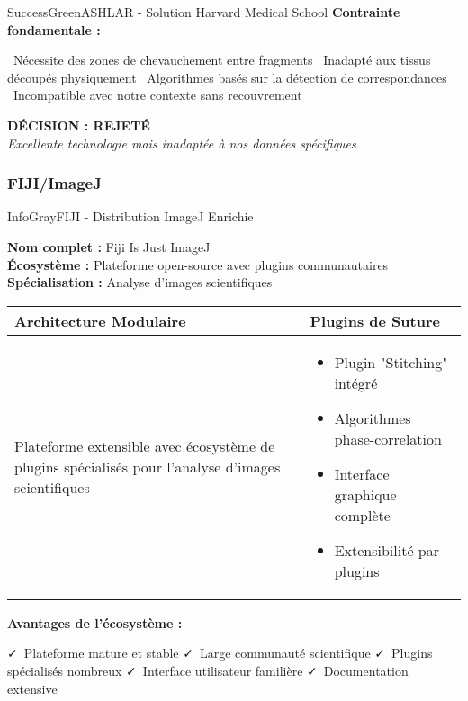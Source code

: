 \documentclass[12pt,a4paper]{report}
\newcommand{\pro}[1]{\textcolor{SuccessGreen}{\faCheck\ #1}}
\newcommand{\con}[1]{\textcolor{DangerRed}{\faTimes\ #1}}
\begin{document}
\begin{}
\begin{}
\begin{}
\begin{}
\begin{techbox}{SuccessGreen}{ASHLAR - Solution Harvard Medical School}
\textbf{Contrainte fondamentale :}
\begin{itemize}[leftmargin=*]
    \con{Nécessite des zones de chevauchement entre fragments}
    \con{Inadapté aux tissus découpés physiquement}
    \con{Algorithmes basés sur la détection de correspondances}
    \con{Incompatible avec notre contexte sans recouvrement}
\end{itemize}

\begin{center}
\textbf{\textcolor{WarningOrange}{DÉCISION : REJETÉ}}\\
\textit{Excellente technologie mais inadaptée à nos données spécifiques}
\end{center}

\end{techbox}

\subsubsection{FIJI/ImageJ}

\begin{techbox}{InfoGray}{FIJI - Distribution ImageJ Enrichie}

\textbf{Nom complet :} Fiji Is Just ImageJ \\
\textbf{Écosystème :} Plateforme open-source avec plugins communautaires \\
\textbf{Spécialisation :} Analyse d'images scientifiques

\vspace{0.5cm}

\begin{tabularx}{\textwidth}{|X|X|}
\hline
\rowcolor{LightGray}
\textbf{Architecture Modulaire} & \textbf{Plugins de Suture} \\
\hline
Plateforme extensible avec écosystème de plugins spécialisés pour l'analyse d'images scientifiques &
\begin{itemize}[nosep]
\item Plugin "Stitching" intégré
\item Algorithmes phase-correlation
\item Interface graphique complète
\item Extensibilité par plugins
\end{itemize} \\
\hline
\end{tabularx}

\vspace{0.5cm}

\textbf{Avantages de l'écosystème :}
\begin{itemize}[leftmargin=*]
    \pro{Plateforme mature et stable}
    \pro{Large communauté scientifique}
    \pro{Plugins spécialisés nombreux}
    \pro{Interface utilisateur familière}
    \pro{Documentation extensive}
\end{itemize}


\end{techbox}
\end{}
\end{}
\end{}
\end{}
\end{document}
